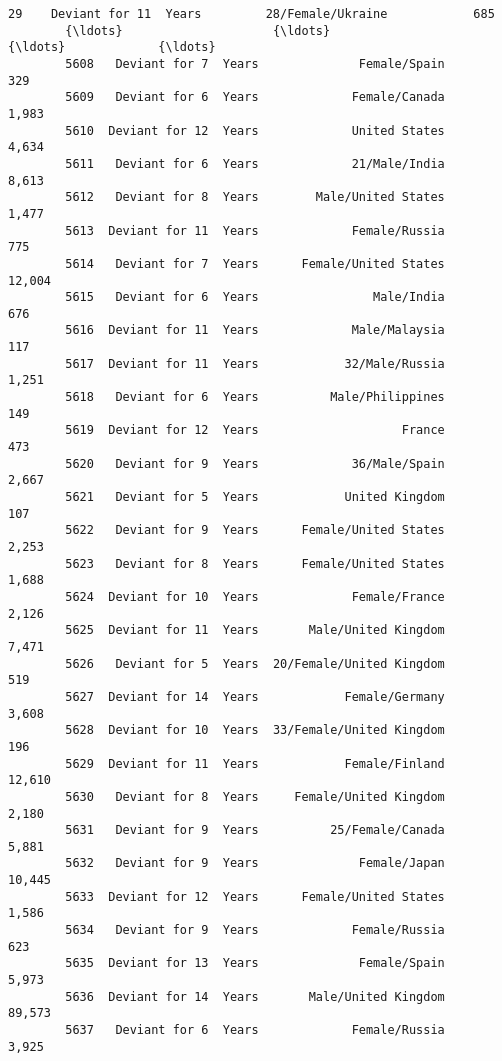 \documentclass[11pt]{article}
\begin{document}
\begin{Verbatim}[commandchars=\\\{\}]
        29    Deviant for 11  Years         28/Female/Ukraine            685    
        {\ldots}                     {\ldots}                       {\ldots}             {\ldots}   
        5608   Deviant for 7  Years              Female/Spain            329    
        5609   Deviant for 6  Years             Female/Canada          1,983    
        5610  Deviant for 12  Years             United States          4,634    
        5611   Deviant for 6  Years             21/Male/India          8,613    
        5612   Deviant for 8  Years        Male/United States          1,477    
        5613  Deviant for 11  Years             Female/Russia            775    
        5614   Deviant for 7  Years      Female/United States         12,004    
        5615   Deviant for 6  Years                Male/India            676    
        5616  Deviant for 11  Years             Male/Malaysia            117    
        5617  Deviant for 11  Years            32/Male/Russia          1,251    
        5618   Deviant for 6  Years          Male/Philippines            149    
        5619  Deviant for 12  Years                    France            473    
        5620   Deviant for 9  Years             36/Male/Spain          2,667    
        5621   Deviant for 5  Years            United Kingdom            107    
        5622   Deviant for 9  Years      Female/United States          2,253    
        5623   Deviant for 8  Years      Female/United States          1,688    
        5624  Deviant for 10  Years             Female/France          2,126    
        5625  Deviant for 11  Years       Male/United Kingdom          7,471    
        5626   Deviant for 5  Years  20/Female/United Kingdom            519    
        5627  Deviant for 14  Years            Female/Germany          3,608    
        5628  Deviant for 10  Years  33/Female/United Kingdom            196    
        5629  Deviant for 11  Years            Female/Finland         12,610    
        5630   Deviant for 8  Years     Female/United Kingdom          2,180    
        5631   Deviant for 9  Years          25/Female/Canada          5,881    
        5632   Deviant for 9  Years              Female/Japan         10,445    
        5633  Deviant for 12  Years      Female/United States          1,586    
        5634   Deviant for 9  Years             Female/Russia            623    
        5635  Deviant for 13  Years              Female/Spain          5,973    
        5636  Deviant for 14  Years       Male/United Kingdom         89,573    
        5637   Deviant for 6  Years             Female/Russia          3,925    
        

\end{Verbatim}
\end{document}
